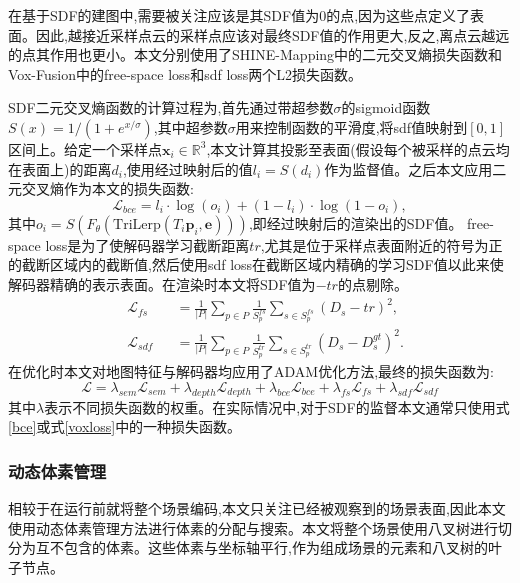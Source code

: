 在基于SDF的建图中,需要被关注应该是其SDF值为0的点,因为这些点定义了表面。因此,越接近采样点云的采样点应该对最终SDF值的作用更大,反之,离点云越远的点其作用也更小。本文分别使用了SHINE-Mapping中的二元交叉熵损失函数和Vox-Fusion中的free-space loss和sdf loss两个L2损失函数。

SDF二元交叉熵函数的计算过程为,首先通过带超参数$\sigma$的sigmoid函数$S(x) = 1/(1 + e^{x/\sigma})$,其中超参数$\sigma$用来控制函数的平滑度,将sdf值映射到$[0,1]$区间上。给定一个采样点$\mathbf{x}_i\in \mathbb{R}^3$,本文计算其投影至表面(假设每个被采样的点云均在表面上)的距离$d_i$,使用经过映射后的值$l_i=S(d_i)$作为监督值。之后本文应用二元交叉熵作为本文的损失函数:
\begin{equation}
    \mathcal{L}_{bce} = l_i\cdot \log(o_i)+(1-l_i)\cdot\log(1-o_i),\label{bce}
\end{equation}
其中$o_i=S(F_\theta(\mbox{TriLerp}(T_i\mathbf{p}_i,\mathbf{e})))$,即经过映射后的渲染出的SDF值。
free-space loss是为了使解码器学习截断距离$tr$,尤其是位于采样点表面附近的符号为正的截断区域内的截断值,然后使用sdf loss在截断区域内精确的学习SDF值以此来使解码器精确的表示表面。在渲染时本文将SDF值为$-tr$的点剔除。
\begin{equation}
    \begin{alignedat}{2}
        &\mathcal{L}_{fs} &&= \frac{1}{|P|}\sum_{p\in P}\frac{1}{S_p^{fs}}\sum_{s\in S_p^{fs}}(D_s-tr)^2,\\
    &\mathcal{L}_{sdf} &&= \frac{1}{|P|}\sum_{p\in P}\frac{1}{S_p^{tr}}\sum_{s\in S_p^{tr}}(D_s-D_s^{gt})^2.\label{voxloss}
    \end{alignedat}
\end{equation}
在优化时本文对地图特征与解码器均应用了ADAM\cite{adam}优化方法,最终的损失函数为:
\begin{equation}
    \mathcal{L} = \lambda_{sem}\mathcal{L}_{sem}+\lambda_{depth}\mathcal{L}_{depth}+\lambda_{bce}\mathcal{L}_{bce}+\lambda_{fs}\mathcal{L}_{fs}+\lambda_{sdf}\mathcal{L}_{sdf}
\end{equation}
其中$\lambda$表示不同损失函数的权重。在实际情况中,对于SDF的监督本文通常只使用式\ref{bce}或式\ref{voxloss}中的一种损失函数。
\subsubsection{动态体素管理}
相较于在运行前就将整个场景编码,本文只关注已经被观察到的场景表面,因此本文使用动态体素管理方法进行体素的分配与搜索。本文将整个场景使用八叉树进行切分为互不包含的体素。这些体素与坐标轴平行,作为组成场景的元素和八叉树的叶子节点。

